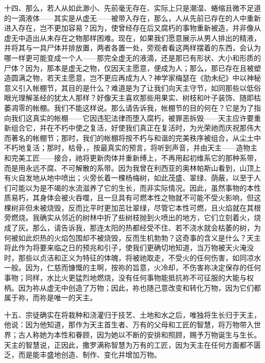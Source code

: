 十四、那么，若人从如此渺小、先前毫无存在、实际上只是潮湿、蜷缩且微不足道的一滴液体——其实是从虚无——被带入存在，那么，人从先前已存在的人中重新进入存在，岂不更加容易？因为，使曾经存在后又腐朽的事物重新被造，并非像从虚无中造出从未存在之物那样困难。现在，如果我们愿意展示从男人排出的精液，并将其与一具尸体并排放置，两者各置一处，旁观者看这两样摆着的东西，会认为哪一样更可能变成一个人——那完全虚无的液滴，还是那已有形状、大小和形质的尸体？因为，那本是虚无之物，仅因天主愿意，便成为人；那么，那已存在且被塑造圆满之物，若天主愿意，岂不更应再成为人？神学家梅瑟在《肋未纪》中以神秘意义引入帐棚节，其目的是什么？难道是为了让我们向天主守节，如同那些以低俗眼光理解圣经的犹太人那样？好像天主喜欢那些用果实、树枝和叶子装饰、随即枯萎凋零的帐棚。我们不能这样说。那么请告诉我，帐棚节的目的何在？它是为了指向我们这真实的帐棚——它因违犯法律而堕入腐朽，被罪恶拆毁——天主应许要重新组合它，并在不朽中使之复活，好使我们真正在复活时，为光荣祂而庆祝那伟大而著名的帐棚节；那时，我们的帐棚将按不朽与和谐的完美秩序被组合，从尘土中不朽地复活；那时，枯骨，，按最真实的预言，将听到声音，并由天主——造物主和完美工匠——接合，祂将更新肉体并重新缚上，不再用起初维系它的那种系带，而是用永远不腐、不可解散的系带。因为我曾在利西亚的奥林帕斯山看到，山顶上有火自发地从地中喷出；火旁长着一棵杨梅树，如此茂盛、翠绿、荫蔽，以至于人们可能以为是不竭的水流滋养了它的生长，而非实际情况。因此，虽然事物的本性质易朽，其身体会被火吞噬，且一旦具有可燃本性之物就不可能不受火影响，但这棵树非但未被烧毁，反而比平时更加茁壮翠绿，尽管它本性可燃，且火焰就在其根旁燃烧。我确实从邻近的树林中折了些树枝抛到火喷出的地方，它们立刻着火，烧成了灰。那么，请告诉我，那连太阳的热都经受不住、若不浇水就会枯萎的树，为何被如此炽热的火焰包围却不被烧毁，反而生机勃勃？这奇事的含义是什么？天主将此作为将要来临之日的预兆和引子，使我们更确切地知道，当万物被天火淹没时，那些以贞洁和正义为特征的体魄，将被祂取走，不受火的任何伤害，如同凉水一般。因为，仁慈而慷慨的主啊，按祢的旨意，火冷却，不伤害祢决定保存的任何事物；同样，水比火更猛烈地燃烧，没有任何事物能抵抗祢不可征服的大能与权柄。因为祢从虚无中创造了万物；因此，祢也随己意改变和转化万物，因为它们都属于祢，而祢是唯一的天主。\par

十五、宗徒确实在将栽种和浇灌归于技艺、土地和水之后，唯独将生长归于天主，他说：因为他知道，那作为天主首生者、万有的父母和工匠的智慧，将万物带入世界；古人称她为本性和眷顾，因为她以不断的安排和照顾，赐予万物诞生与生长。天主的智慧说，正因此，撒罗满称智慧为万有的工匠，因为天主在任何方面都不匮乏，而是能丰盛地创造、制作、变化并增加万物。\par

